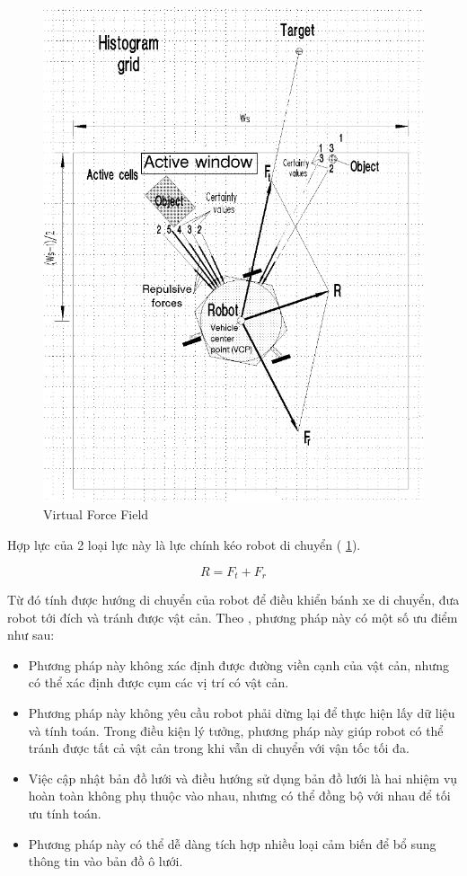 \begin{figure}[htp]
  \centering
  \includegraphics[width=1\linewidth]{figures/VFFconcept.png}
  \caption{Virtual Force Field \cite{Koren1991}}
  \label{fig:VFFconcept}
\end{figure}

Hợp lực của 2 loại lực này là lực chính kéo robot di chuyển (\figurename{ \ref{fig:VFFconcept}}).

\begin{equation}
  R = {F}_{t} + {F}_{r}
\end{equation}


Từ đó tính được hướng di chuyển của robot để điều khiển bánh xe di chuyển, đưa robot tới đích và tránh được vật cản. Theo \cite{Borenstein1988}, phương pháp này có một số ưu điểm như sau:
\begin{itemize}
  \item Phương pháp này không xác định được đường viền cạnh của vật cản, nhưng có thể xác định được cụm các vị trí có vật cản.
  \item Phương pháp này không yêu cầu robot phải dừng lại để thực hiện lấy dữ liệu và tính toán. Trong điều kiện lý tưởng, phương pháp này giúp robot có thể tránh được tất cả vật cản trong khi vẫn di chuyển với vận tốc tối đa.
  \item Việc cập nhật bản đồ lưới và điều hướng sử dụng bản đồ lưới là hai nhiệm vụ hoàn toàn không phụ thuộc vào nhau, nhưng có thể đồng bộ với nhau để tối ưu tính toán.
  \item Phương pháp này có thể dễ dàng tích hợp nhiều loại cảm biến để bổ sung thông tin vào bản đồ ô lưới.
\end{itemize}

